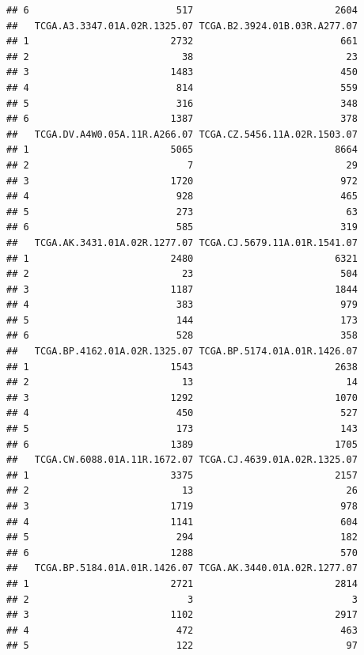 \documentclass[
]{article}
\begin{document}
\begin{verbatim}
## 6                          517                         2604
##   TCGA.A3.3347.01A.02R.1325.07 TCGA.B2.3924.01B.03R.A277.07
## 1                         2732                          661
## 2                           38                           23
## 3                         1483                          450
## 4                          814                          559
## 5                          316                          348
## 6                         1387                          378
##   TCGA.DV.A4W0.05A.11R.A266.07 TCGA.CZ.5456.11A.02R.1503.07
## 1                         5065                         8664
## 2                            7                           29
## 3                         1720                          972
## 4                          928                          465
## 5                          273                           63
## 6                          585                          319
##   TCGA.AK.3431.01A.02R.1277.07 TCGA.CJ.5679.11A.01R.1541.07
## 1                         2480                         6321
## 2                           23                          504
## 3                         1187                         1844
## 4                          383                          979
## 5                          144                          173
## 6                          528                          358
##   TCGA.BP.4162.01A.02R.1325.07 TCGA.BP.5174.01A.01R.1426.07
## 1                         1543                         2638
## 2                           13                           14
## 3                         1292                         1070
## 4                          450                          527
## 5                          173                          143
## 6                         1389                         1705
##   TCGA.CW.6088.01A.11R.1672.07 TCGA.CJ.4639.01A.02R.1325.07
## 1                         3375                         2157
## 2                           13                           26
## 3                         1719                          978
## 4                         1141                          604
## 5                          294                          182
## 6                         1288                          570
##   TCGA.BP.5184.01A.01R.1426.07 TCGA.AK.3440.01A.02R.1277.07
## 1                         2721                         2814
## 2                            3                            3
## 3                         1102                         2917
## 4                          472                          463
## 5                          122                           97

\end{verbatim}
\end{document}
